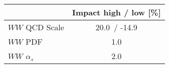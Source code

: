 \begin{tabular}{| l || c | }
\hline 
& Impact high / low [\%] \tabularnewline
\hline
$WW$ QCD Scale & 20.0\, / -14.9 \tabularnewline
$WW$ PDF & 1.0 \tabularnewline
$WW$ $\alpha_s$ & 2.0 \tabularnewline
\hline
\end{tabular}
